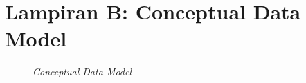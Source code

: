 \chapter{Lampiran B: Conceptual Data Model} \label{lampiran:cdm}
\begin{figure}[H]
	\caption{\textit{Conceptual Data Model}}
\end{figure}
